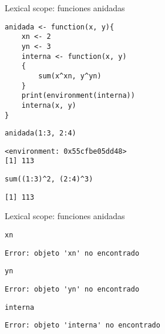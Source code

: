 \documentclass[xcolor={usenames,svgnames,dvipsnames}]{beamer}
\begin{document}
\begin{frame}[fragile,label={sec:org104c124}]{Lexical scope: funciones anidadas}
 \lstset{language=r,label= ,caption= ,captionpos=b,numbers=none}
\begin{lstlisting}
anidada <- function(x, y){
    xn <- 2
    yn <- 3
    interna <- function(x, y)
    {
        sum(x^xn, y^yn)
    }
    print(environment(interna))
    interna(x, y)
}
\end{lstlisting}

\lstset{language=r,label= ,caption= ,captionpos=b,numbers=none}
\begin{lstlisting}
anidada(1:3, 2:4)
\end{lstlisting}

\begin{verbatim}
<environment: 0x55cfbe05dd48>
[1] 113
\end{verbatim}

\lstset{language=r,label= ,caption= ,captionpos=b,numbers=none}
\begin{lstlisting}
sum((1:3)^2, (2:4)^3)
\end{lstlisting}

\begin{verbatim}
[1] 113
\end{verbatim}
\end{frame}

\begin{frame}[fragile,label={sec:org9d96654}]{Lexical scope: funciones anidadas}
 \lstset{language=r,label= ,caption= ,captionpos=b,numbers=none}
\begin{lstlisting}
xn
\end{lstlisting}

\begin{verbatim}
Error: objeto 'xn' no encontrado
\end{verbatim}

\lstset{language=r,label= ,caption= ,captionpos=b,numbers=none}
\begin{lstlisting}
yn
\end{lstlisting}

\begin{verbatim}
Error: objeto 'yn' no encontrado
\end{verbatim}

\lstset{language=r,label= ,caption= ,captionpos=b,numbers=none}
\begin{lstlisting}
interna
\end{lstlisting}

\begin{verbatim}
Error: objeto 'interna' no encontrado
\end{verbatim}
\end{frame}
\end{document}
